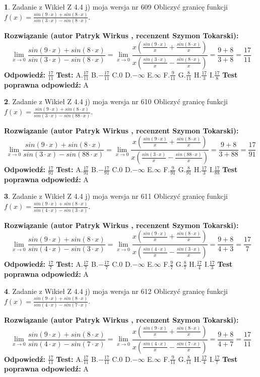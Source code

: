 \documentclass[12pt, a4paper]{article}
\theoremstyle{definition} %
\newtheorem{zad}{}
\newcommand{\zadStart}[1]{\begin{zad}#1\newline}
\newcommand{\zadStop}{\end{zad}}
\newcommand{\rozwStart}[2]{\noindent \textbf{Rozwiązanie (autor #1 , recenzent #2): }\newline}
\newcommand{\rozwStop}{\newline}
\newcommand{\odpStart}{\noindent \textbf{Odpowiedź:}\newline}
\newcommand{\odpStop}{\newline}
\newcommand{\testStart}{\noindent \textbf{Test:}\newline}
\newcommand{\testStop}{\newline}
\newcommand{\kluczStart}{\noindent \textbf{Test poprawna odpowiedź:}\newline}
\newcommand{\kluczStop}{\newline}
\begin{document}
\zadStart{Zadanie z Wikieł Z 4.4 j) moja wersja nr 609}
Obliczyć granicę funkcji $f(x)=\frac{sin(9\cdot x) +sin(8\cdot x)}{sin(3\cdot x) -sin(8\cdot x)}$.
\zadStop
\rozwStart{Patryk Wirkus}{Szymon Tokarski}
$$\lim\limits_{x\to 0}\frac{sin(9\cdot x) +sin(8\cdot x)}{sin(3\cdot x) -sin(8\cdot x)}=\lim\limits_{x\to 0}\frac{x(\frac{sin(9\cdot x)}{x}+\frac{sin(8\cdot x)}{x})}{x(\frac{sin(3\cdot x)}{x}-\frac{sin(8\cdot x)}{x})}=\frac{9+8}{3+8} = \frac{17}{11}$$
\rozwStop
\odpStart
$\frac{17}{11}$
\odpStop
\testStart
A.$\frac{17}{11}$
B.$-\frac{17}{11}$
C.$0$
D.$-\infty$
E.$\infty$
F.$\frac{9}{11}$
G.$\frac{8}{11}$
H.$\frac{17}{3}$
I.$\frac{17}{8}$
\testStop
\kluczStart
A
\kluczStop



\zadStart{Zadanie z Wikieł Z 4.4 j) moja wersja nr 610}
Obliczyć granicę funkcji $f(x)=\frac{sin(9\cdot x) +sin(8\cdot x)}{sin(3\cdot x) -sin(88\cdot x)}$.
\zadStop
\rozwStart{Patryk Wirkus}{Szymon Tokarski}
$$\lim\limits_{x\to 0}\frac{sin(9\cdot x) +sin(8\cdot x)}{sin(3\cdot x) -sin(88\cdot x)}=\lim\limits_{x\to 0}\frac{x(\frac{sin(9\cdot x)}{x}+\frac{sin(8\cdot x)}{x})}{x(\frac{sin(3\cdot x)}{x}-\frac{sin(88\cdot x)}{x})}=\frac{9+8}{3+88} = \frac{17}{91}$$
\rozwStop
\odpStart
$\frac{17}{91}$
\odpStop
\testStart
A.$\frac{17}{91}$
B.$-\frac{17}{91}$
C.$0$
D.$-\infty$
E.$\infty$
F.$\frac{9}{91}$
G.$\frac{8}{91}$
H.$\frac{17}{3}$
I.$\frac{17}{88}$
\testStop
\kluczStart
A
\kluczStop



\zadStart{Zadanie z Wikieł Z 4.4 j) moja wersja nr 611}
Obliczyć granicę funkcji $f(x)=\frac{sin(9\cdot x) +sin(8\cdot x)}{sin(4\cdot x) -sin(3\cdot x)}$.
\zadStop
\rozwStart{Patryk Wirkus}{Szymon Tokarski}
$$\lim\limits_{x\to 0}\frac{sin(9\cdot x) +sin(8\cdot x)}{sin(4\cdot x) -sin(3\cdot x)}=\lim\limits_{x\to 0}\frac{x(\frac{sin(9\cdot x)}{x}+\frac{sin(8\cdot x)}{x})}{x(\frac{sin(4\cdot x)}{x}-\frac{sin(3\cdot x)}{x})}=\frac{9+8}{4+3} = \frac{17}{7}$$
\rozwStop
\odpStart
$\frac{17}{7}$
\odpStop
\testStart
A.$\frac{17}{7}$
B.$-\frac{17}{7}$
C.$0$
D.$-\infty$
E.$\infty$
F.$\frac{9}{7}$
G.$\frac{8}{7}$
H.$\frac{17}{4}$
I.$\frac{17}{3}$
\testStop
\kluczStart
A
\kluczStop



\zadStart{Zadanie z Wikieł Z 4.4 j) moja wersja nr 612}
Obliczyć granicę funkcji $f(x)=\frac{sin(9\cdot x) +sin(8\cdot x)}{sin(4\cdot x) -sin(7\cdot x)}$.
\zadStop
\rozwStart{Patryk Wirkus}{Szymon Tokarski}
$$\lim\limits_{x\to 0}\frac{sin(9\cdot x) +sin(8\cdot x)}{sin(4\cdot x) -sin(7\cdot x)}=\lim\limits_{x\to 0}\frac{x(\frac{sin(9\cdot x)}{x}+\frac{sin(8\cdot x)}{x})}{x(\frac{sin(4\cdot x)}{x}-\frac{sin(7\cdot x)}{x})}=\frac{9+8}{4+7} = \frac{17}{11}$$
\rozwStop
\odpStart
$\frac{17}{11}$
\odpStop
\testStart
A.$\frac{17}{11}$
B.$-\frac{17}{11}$
C.$0$
D.$-\infty$
E.$\infty$
F.$\frac{9}{11}$
G.$\frac{8}{11}$
H.$\frac{17}{4}$
I.$\frac{17}{7}$
\testStop
\kluczStart
A
\kluczStop
\end{document}
